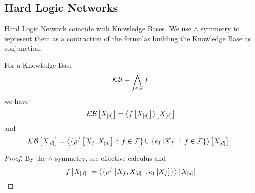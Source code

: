 














\subsection{Hard Logic Networks}

Hard Logic Network coincide with Knowledge Bases.
We use $\land$ symmetry to represent them as a contraction of the formulas building the Knowledge Base as conjunction.

\begin{theorem}\label{the:conDecKB}
	For a Knowledge Base
		\[ \mathcal{KB} = \bigwedge_{f\in\mathcal{F}} f \]
	we have
		\[ \mathcal{KB}\left[X_{[d]}\right] = \left\langle f\left[X_{[d]}\right]\right\rangle \left[ X_{[d]} \right]   \]
	and
		\[ \mathcal{KB}\left[X_{[d]}\right] = \left\langle \{\rho^{f}\left[X_{f},X_{[d]}\right] \, : \, f\in\mathcal{F}\} \cup \{e_{1}\left[X_{f}\right] \, : \, f\in\mathcal{F}\} \right\rangle \left[ X_{[d]} \right] \, .  \]
\end{theorem}
\begin{proof}
	By the $\land$-symmetry, see effective calculus and 
		\[ f\left[X_{[d]}\right] =  \left\langle \{\rho^{f}\left[X_{f},X_{[d]}\right], e_{1}\left[X_{f}\right]\} \right\rangle \left[ X_{[d]} \right] \]
\end{proof}


